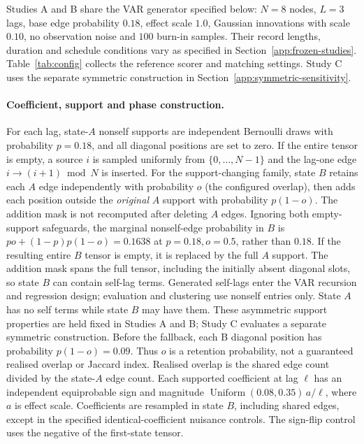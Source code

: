 \documentclass[11pt]{article}
\begin{document}
Studies A and B share the VAR generator specified below: $N{=}8$ nodes,
$L{=}3$ lags, base edge probability $0.18$, effect scale $1.0$, Gaussian
innovations with scale $0.10$, no observation noise and $100$ burn-in samples.
Their record lengths, duration and schedule conditions vary as specified in
Section~\ref{app:frozen-studies}. Table~\ref{tab:config} collects the reference
scorer and matching settings. Study C uses the separate symmetric construction
in Section~\ref{app:symmetric-sensitivity}.

\paragraph{Coefficient, support and phase construction.}
For each lag, state-$A$ nonself supports are independent Bernoulli draws with
probability $p=0.18$, and all diagonal positions are set to zero.
If the entire tensor is empty, a source $i$ is sampled uniformly from
$\{0,\ldots,N-1\}$ and the lag-one edge $i\to(i+1)\bmod N$ is inserted.
For the support-changing family, state $B$ retains each $A$ edge independently
with probability $o$ (the configured overlap), then adds each position outside
the \emph{original} $A$ support with probability $p(1-o)$.
The addition mask is not recomputed after deleting $A$ edges. Ignoring both
empty-support safeguards, the marginal nonself-edge probability in $B$ is
$po+(1-p)p(1-o)=0.1638$ at $p=0.18,o=0.5$, rather than $0.18$.
If the resulting entire $B$ tensor is empty, it is replaced by the full $A$
support. The
addition mask spans the full tensor, including the initially absent diagonal
slots, so state $B$ can contain self-lag terms. Generated self-lags enter the
VAR recursion and regression design; evaluation and clustering use nonself
entries only. State $A$ has no self terms while state $B$ may have them.
These asymmetric support properties are held fixed in Studies A and B;
Study C evaluates a separate symmetric construction. Before the fallback,
each B diagonal position has probability
$p(1-o)=0.09$. Thus $o$ is a retention probability, not a guaranteed realised
overlap or Jaccard index. Realised
overlap is the shared edge count divided by the state-$A$ edge count. Each
supported coefficient at lag $\ell$ has an independent equiprobable sign and
magnitude $\operatorname{Uniform}(0.08,0.35)\,a/\ell$, where $a$ is effect scale.
Coefficients are resampled in state $B$, including shared edges, except in the
specified identical-coefficient nuisance controls. The sign-flip control uses
the negative of the first-state tensor.
\end{document}
